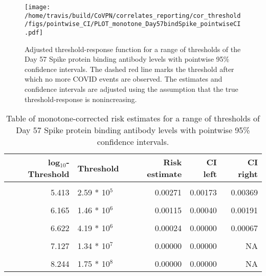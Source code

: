 \documentclass[]{book}
\theoremstyle{definition}
\theoremstyle{definition}
\theoremstyle{definition}
\newcommand{\1}{\mathbbm{1}}
\begin{document}
\begin{figure}[H]
\centering
\texttt{[image: /home/travis/build/CoVPN/correlates\_reporting/cor\_threshold/figs/pointwise\_CI/PLOT\_monotone\_Day57bindSpike\_pointwiseCI.pdf]}
\caption{Adjusted threshold-response function for a range of thresholds of the
  Day 57 Spike protein binding antibody levels with pointwise 95\% confidence intervals. The dashed red line marks the threshold after which no more COVID events are observed. The estimates and confidence intervals are adjusted using the assumption that the true threshold-response is nonincreasing.}
\end{figure}
\begin{table}[!h]

\caption{\label{tab:unnamed-chunk-363}Table of monotone-corrected risk estimates for a range of thresholds of Day 57 Spike protein binding antibody levels with pointwise 95\% confidence intervals.}
\centering
\begin{tabular}[t]{rlrrr}
\toprule
log$_{10}$-Threshold & Threshold & Risk estimate & CI left & CI right\\
\midrule
\cellcolor{gray!6}{4.536} & \cellcolor{gray!6}{3.44 * 10$^4$} & \cellcolor{gray!6}{0.00480} & \cellcolor{gray!6}{0.00353} & \cellcolor{gray!6}{0.00608}\\
5.413 & 2.59 * 10$^5$ & 0.00271 & 0.00173 & 0.00369\\
\cellcolor{gray!6}{5.797} & \cellcolor{gray!6}{6.27 * 10$^5$} & \cellcolor{gray!6}{0.00172} & \cellcolor{gray!6}{0.00090} & \cellcolor{gray!6}{0.00255}\\
6.165 & 1.46 * 10$^6$ & 0.00115 & 0.00040 & 0.00191\\
\cellcolor{gray!6}{6.405} & \cellcolor{gray!6}{2.54 * 10$^6$} & \cellcolor{gray!6}{0.00083} & \cellcolor{gray!6}{0.00012} & \cellcolor{gray!6}{0.00153}\\
6.622 & 4.19 * 10$^6$ & 0.00024 & 0.00000 & 0.00067\\
\cellcolor{gray!6}{6.820} & \cellcolor{gray!6}{6.61 * 10$^6$} & \cellcolor{gray!6}{0.00024} & \cellcolor{gray!6}{0.00000} & \cellcolor{gray!6}{0.00083}\\
7.127 & 1.34 * 10$^7$ & 0.00000 & 0.00000 & NA\\
\cellcolor{gray!6}{7.409} & \cellcolor{gray!6}{2.56 * 10$^7$} & \cellcolor{gray!6}{0.00000} & \cellcolor{gray!6}{0.00000} & \cellcolor{gray!6}{NA}\\
8.244 & 1.75 * 10$^8$ & 0.00000 & 0.00000 & NA\\
\bottomrule
\end{tabular}
\end{table}
\end{document}
